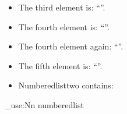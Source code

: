 \documentclass{article}
\newcommand{\fourthelement}{\getnthelement{4}}
\begin{document}

\begin{itemize}
\item The third element is: ``''.
\item The fourth element is: ``\fourthelement''.
\item The fourth element again: ``\fourthelement''.
\item The fifth element is: ``''.
\item Numberedlisttwo contains: 
\end{itemize}
\seq_use:Nn numberedlist

\texttt{\meaning\playaroundelement}
\end{document}
